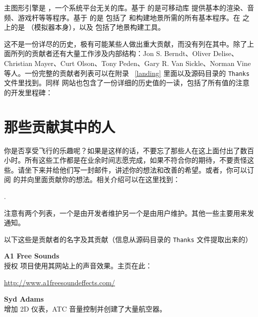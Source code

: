 主图形引擎是 \textbf{}，一个系统平台无关的库。基于  的是可移动库 \PLIB{} 提供基本的渲染、音频、游戏杆等等程序。基于  \PLIB{} 的是 \SimGear{} 包括了 \FlightGear{} 和构建地景所需的所有基本程序。在 \SimGear{} 之上的是 \FlightGear{}（模拟器本身），以及 \TerraGear{} 包括了地景构建工具。

这不是一份详尽的历史，极有可能某些人做出重大贡献，而没有列在其中。除了上面所列的贡献者还有大量工作涉及内部结构：Jon S. Berndt、Oliver Delise、Christian Mayer、Curt Olson、Tony Peden、Gary R. Van Sickle、Norman Vine 等人。一份完整的贡献者列表可以在附录 ~\ref{landing} 里面以及源码目录的 \texttt{Thanks} 文件里找到。同样 \FlightGear{} 网站也包含了一份详细的历史值的一读，包括了所有值的注意的开发里程碑：
 \medskip

 
\section{那些贡献其中的人}

你是否享受飞行的乐趣呢？如果是这样的话，不要忘了那些人在这上面付出了数百小时。所有这些工作都是在业余时间志愿完成，如果不符合你的期待，不要责怪这些。请坐下来并给他们写一封邮件，讲述你的想法和改善的希望。或者，你可以订阅 \FlightGear{} 的并向里面贡献你的想法。相关介绍可以在这里找到：
 \medskip

 .
  \medskip

\noindent
注意有两个列表，一个是由开发者维护另一个是由用户维护。其他一些主要用来发通知。
\medskip

 \noindent
以下这些是贡献者的名字及其贡献（信息从源码目录的 \texttt{Thanks} 文件提取出来的）
 \medskip
 
\noindent \textbf{A1 Free Sounds}\\
授权 \FlightGear{} 项目使用其网站上的声音效果。主页在此：
   \medskip

   \href{http://www.a1freesoundeffects.com/}{http://www.a1freesoundeffects.com/}
   \medskip

\noindent \textbf{Syd Adams}\\
  增加 2D 仪表，ATC 音量控制并创建了大量航空器。
 \medskip

